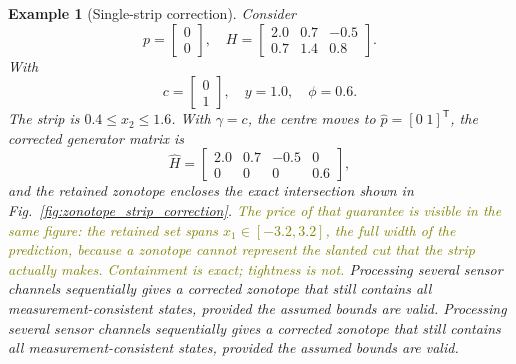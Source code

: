 \documentclass[11pt,oneside,openany]{book}
\newtheorem{example}{Example}[chapter]
\begin{document}
\begin{example}[Single-strip correction]
\label{ex:zonotope-strip}
Consider
\begin{equation}
p=
\begin{bmatrix}
0\\
0
\end{bmatrix},
\quad
H=
\begin{bmatrix}
2.0 & 0.7 & -0.5\\
0.7 & 1.4 & 0.8
\end{bmatrix}.
\end{equation}
With
\begin{equation}
c=
\begin{bmatrix}
0\\
1
\end{bmatrix},
\quad
y=1.0,\quad
\phi=0.6.
\end{equation}
The strip is $0.4\le x_2\le1.6$. With $\gamma=c$, the centre moves to $\hat p=[0\;1]^{\mathsf T}$, the corrected generator matrix is
\begin{equation}
\hat H=
\begin{bmatrix}
2.0 & 0.7 & -0.5 & 0\\
0 & 0 & 0 & 0.6
\end{bmatrix},
\end{equation}
and the retained zonotope encloses the exact intersection shown in Fig.~\ref{fig:zonotope_strip_correction}. \textcolor{olive}{The price of that guarantee is visible in the same figure: the retained set spans $x_1\in[-3.2,3.2]$, the full width of the prediction, because a zonotope cannot represent the slanted cut that the strip actually makes. Containment is exact; tightness is not.} Processing several sensor channels sequentially gives a corrected zonotope that still contains all measurement-consistent states, provided the assumed bounds are valid.
Processing several sensor channels sequentially gives a corrected zonotope that still contains all measurement-consistent states, provided the assumed bounds are valid.
\end{example}
\end{document}
